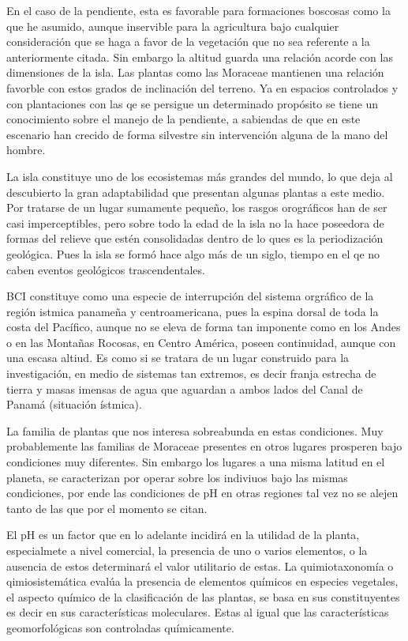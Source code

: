 \documentclass[11pt,]{article}
\begin{document}
En el caso de la pendiente, esta es favorable para formaciones boscosas
como la que he asumido, aunque inservible para la agricultura bajo
cualquier consideración que se haga a favor de la vegetación que no sea
referente a la anteriormente citada. Sin embargo la altitud guarda una
relación acorde con las dimensiones de la isla. Las plantas como las
Moraceae mantienen una relación favorble con estos grados de inclinación
del terreno. Ya en espacios controlados y con plantaciones con las qe se
persigue un determinado propósito se tiene un conocimiento sobre el
manejo de la pendiente, a sabiendas de que en este escenario han crecido
de forma silvestre sin intervención alguna de la mano del hombre.

La isla constituye uno de los ecosistemas más grandes del mundo, lo que
deja al descubierto la gran adaptabilidad que presentan algunas plantas
a este medio. Por tratarse de un lugar sumamente pequeño, los rasgos
orográficos han de ser casi imperceptibles, pero sobre todo la edad de
la isla no la hace poseedora de formas del relieve que estén
consolidadas dentro de lo ques es la periodización geológica. Pues la
isla se formó hace algo más de un siglo, tiempo en el qe no caben
eventos geológicos trascendentales.

BCI constituye como una especie de interrupción del sistema orgráfico de
la región istmica panameña y centroamericana, pues la espina dorsal de
toda la costa del Pacífico, aunque no se eleva de forma tan imponente
como en los Andes o en las Montañas Rocosas, en Centro América, poseen
continuidad, aunque con una escasa altiud. Es como si se tratara de un
lugar construido para la investigación, en medio de sistemas tan
extremos, es decir franja estrecha de tierra y masas imensas de agua que
aguardan a ambos lados del Canal de Panamá (situación ístmica).

La familia de plantas que nos interesa sobreabunda en estas condiciones.
Muy probablemente las familias de Moraceae presentes en otros lugares
prosperen bajo condiciones muy diferentes. Sin embargo los lugares a una
misma latitud en el planeta, se caracterizan por operar sobre los
indiviuos bajo las mismas condiciones, por ende las condiciones de pH en
otras regiones tal vez no se alejen tanto de las que por el momento se
citan.

El pH es un factor que en lo adelante incidirá en la utilidad de la
planta, especialmete a nivel comercial, la presencia de uno o varios
elementos, o la ausencia de estos determinará el valor utilitario de
estas. La quimiotaxonomía o qimiosistemática evalúa la presencia de
elementos químicos en especies vegetales, el aspecto químico de la
clasificación de las plantas, se basa en sus constituyentes es decir en
sus características moleculares. Estas al igual que las características
geomorfológicas son controladas químicamente.
\end{document}
